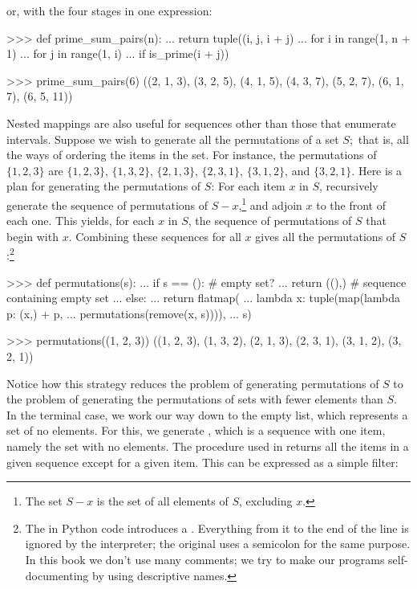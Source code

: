 \noindent
or, with the four stages in one expression:

\begin{codeBlock}
>>> def prime_sum_pairs(n):
...     return tuple((i, j, i + j)
...                  for i in range(1, n + 1)
...                  for j in range(1, i)
...                  if is_prime(i + j))

>>> prime_sum_pairs(6)
((2, 1, 3), (3, 2, 5), (4, 1, 5), (4, 3, 7), (5, 2, 7), (6, 1, 7), (6, 5, 11))
\end{codeBlock}

\noindent
Nested mappings are also useful for sequences other than those that enumerate
intervals.  Suppose we wish to generate all the permutations of a set \( S; \)
that is, all the ways of ordering the items in the set.  For instance, the
permutations of \( \{1, 2, 3\} \) are \( \{1, 2, 3\} \), \( \{1, 3, 2\} \), \(
\{2, 1, 3\} \), \( \{2, 3, 1\} \), \( \{3, 1, 2\} \), and \( \{3, 2, 1\} \).
Here is a plan for generating the permutations of \( S \): For each item \( x
\) in \( S \), recursively generate the sequence of permutations of \( S - x
\),\footnote{The set \( S - x \) is the set of all elements of \( S \),
excluding \( x \).} and adjoin \( x \) to the front of each one. This yields,
for each \( x \) in \( S \), the sequence of permutations of \( S \) that begin
with \( x \).  Combining these sequences for all \( x \) gives all the
permutations of \( S \):\footnote{The \code{\#} in Python code introduces a
.  Everything from it to the end of the line is ignored by the
interpreter; the original uses a semicolon for the same purpose.  In this book
we don't use many comments; we try to make our programs self-documenting by
using descriptive names.}

\begin{codeBlock}
>>> def permutations(s):
...     if s == ():             # empty set?
...         return ((),)        # sequence containing empty set
...     else:
...         return flatmap(
...             lambda x: tuple(map(lambda p: (x,) + p,
...                                 permutations(remove(x, s)))),
...             s)

>>> permutations((1, 2, 3))
((1, 2, 3), (1, 3, 2), (2, 1, 3), (2, 3, 1), (3, 1, 2), (3, 2, 1))
\end{codeBlock}

\noindent
Notice how this strategy reduces the problem of generating permutations of \( S
\) to the problem of generating the permutations of sets with fewer elements
than \( S \).  In the terminal case, we work our way down to the empty list,
which represents a set of no elements.  For this, we generate , which is a sequence with one item, namely the set with no elements.  The
 procedure used in  returns all the items in a
given sequence except for a given item.  This can be expressed as a simple
filter:

